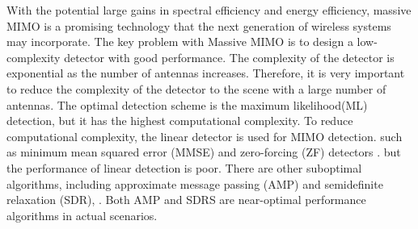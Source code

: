 \documentclass[conference]{IEEEtran}
\begin{document}
With the potential large gains in spectral efficiency and energy efficiency, massive MIMO is a promising technology that the next generation of wireless systems may incorporate\cite{MIMO1}. The key problem with Massive MIMO is to design a low-complexity detector with good performance. The complexity of the detector is exponential as the number of antennas increases. Therefore, it is very important to reduce the complexity of the detector to the scene with a large number of antennas. The optimal detection scheme is the maximum likelihood(ML) detection, but it has the highest computational complexity. To reduce computational complexity, the linear detector is used for MIMO detection. such as minimum mean squared error (MMSE) and zero-forcing (ZF) detectors \cite{MIMO2}. but the performance of linear detection is poor. There are other suboptimal algorithms, including approximate
message passing (AMP) and semidefinite relaxation (SDR)\cite{problem}, \cite{detector}. Both AMP and SDRS are near-optimal performance algorithms in actual scenarios.
\end{document}
